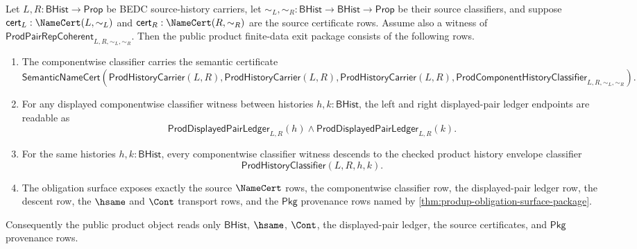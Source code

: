 \begin{theorem}
\label{thm:prod-public-finite-data-exit-package}
Let $L,R:\mathsf{BHist}\to\mathsf{Prop}$ be BEDC source-history carriers, let
$\sim_L,\sim_R:\mathsf{BHist}\to\mathsf{BHist}\to\mathsf{Prop}$ be their
source classifiers, and suppose
$\mathsf{cert}_L:\NameCert(L,\sim_L)$ and
$\mathsf{cert}_R:\NameCert(R,\sim_R)$ are the source certificate rows. Assume
also a witness of
$\mathsf{ProdPairRepCoherent}_{L,R,\sim_L,\sim_R}$. Then the public product
finite-data exit package consists of the following rows.
\begin{enumerate}
  \item The componentwise classifier carries the semantic certificate
  $$
  \mathsf{SemanticNameCert}(\mathsf{ProdHistoryCarrier}(L,R),
  \mathsf{ProdHistoryCarrier}(L,R),
  \mathsf{ProdHistoryCarrier}(L,R),
  \mathsf{ProdComponentHistoryClassifier}_{L,R,\sim_L,\sim_R}).
  $$
  \item For any displayed componentwise classifier witness between histories
  $h,k:\mathsf{BHist}$, the left and right displayed-pair ledger endpoints are
  readable as
  $$
  \mathsf{ProdDisplayedPairLedger}_{L,R}(h)
  \land
  \mathsf{ProdDisplayedPairLedger}_{L,R}(k).
  $$
  \item For the same histories $h,k:\mathsf{BHist}$, every componentwise
  classifier witness descends to the checked product history envelope
  classifier
  $$
  \mathsf{ProdHistoryClassifier}(L,R,h,k).
  $$
  \item The obligation surface exposes exactly the source $\NameCert$ rows,
  the componentwise classifier row, the displayed-pair ledger row, the descent
  row, the $\hsame$ and $\Cont$ transport rows, and the $\mathsf{Pkg}$
  provenance rows named by \autoref{thm:produp-obligation-surface-package}.
\end{enumerate}
Consequently the public product object reads only $\mathsf{BHist}$, $\hsame$,
$\Cont$, the displayed-pair ledger, the source certificates, and
$\mathsf{Pkg}$ provenance rows.
\end{theorem}
